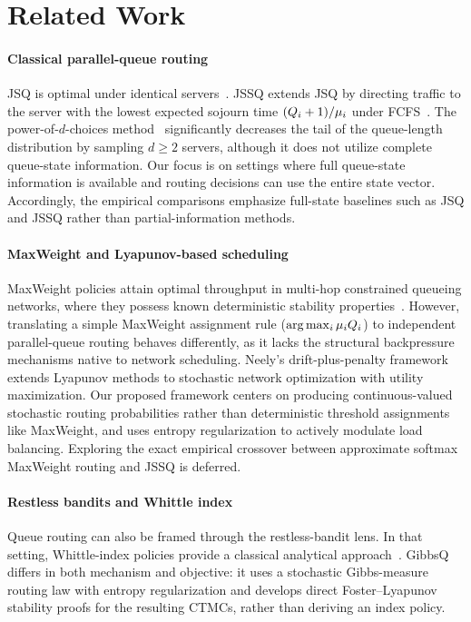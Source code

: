 
\section{Related Work}
\label{sec:related_work}

\paragraph{Classical parallel-queue routing}
JSQ is optimal under identical servers~\cite{weber1978optimal,winston1977optimality}.
JSSQ extends JSQ by directing traffic to the server with the lowest expected sojourn time $(Q_{i}+1)/\mu_i$ under FCFS~\cite{ephremides1980simple}.
The power-of-$d$-choices method~\cite{mitzenmacher2001power} significantly decreases the tail of the queue-length distribution by sampling $d \geq 2$ servers, although it does not utilize complete queue-state information.
Our focus is on settings where full queue-state information is available and routing decisions can use the entire state vector. Accordingly, the empirical comparisons emphasize full-state baselines such as JSQ and JSSQ rather than partial-information methods.

\paragraph{MaxWeight and Lyapunov-based scheduling}
MaxWeight policies attain optimal throughput in multi-hop constrained queueing networks, where they possess known deterministic stability properties~\cite{tassiulas1992stability}. However, translating a simple MaxWeight assignment rule ($\arg\max_i \mu_i Q_{i}$) to independent parallel-queue routing behaves differently, as it lacks the structural backpressure mechanisms native to network scheduling.
Neely's drift-plus-penalty framework~\cite{neely2010stochastic} extends Lyapunov methods to stochastic network optimization with utility maximization.
Our proposed framework centers on producing continuous-valued stochastic routing probabilities rather than deterministic threshold assignments like MaxWeight, and uses entropy regularization to actively modulate load balancing. Exploring the exact empirical crossover between approximate softmax MaxWeight routing and JSSQ is deferred.

\paragraph{Restless bandits and Whittle index}
Queue routing can also be framed through the restless-bandit lens. In that setting, Whittle-index policies provide a classical analytical approach~\cite{weber1990index,ninomora2002restless}. GibbsQ differs in both mechanism and objective: it uses a stochastic Gibbs-measure routing law with entropy regularization and develops direct Foster--Lyapunov stability proofs for the resulting CTMCs, rather than deriving an index policy.

